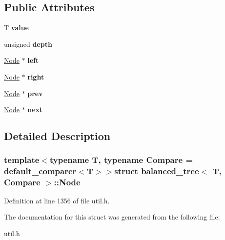 \subsection*{Public Attributes}
\begin{DoxyCompactItemize}
\item 
\hypertarget{structbalanced__tree_1_1Node_a69d2192f5a2a3c1ce82fd7b8a99e6654}{T {\bfseries value}}\label{structbalanced__tree_1_1Node_a69d2192f5a2a3c1ce82fd7b8a99e6654}

\item 
\hypertarget{structbalanced__tree_1_1Node_a7e92fc4d0addec0e7956eaa6088ae014}{unsigned {\bfseries depth}}\label{structbalanced__tree_1_1Node_a7e92fc4d0addec0e7956eaa6088ae014}

\item 
\hypertarget{structbalanced__tree_1_1Node_ab3452de39a8f961ca4b76d336e8ef0c0}{\hyperlink{structbalanced__tree_1_1Node}{Node} $\ast$ {\bfseries left}}\label{structbalanced__tree_1_1Node_ab3452de39a8f961ca4b76d336e8ef0c0}

\item 
\hypertarget{structbalanced__tree_1_1Node_a68732d6d4528935c840672abe489b930}{\hyperlink{structbalanced__tree_1_1Node}{Node} $\ast$ {\bfseries right}}\label{structbalanced__tree_1_1Node_a68732d6d4528935c840672abe489b930}

\item 
\hypertarget{structbalanced__tree_1_1Node_a0e9185b9161946f62da07df8ca0c3041}{\hyperlink{structbalanced__tree_1_1Node}{Node} $\ast$ {\bfseries prev}}\label{structbalanced__tree_1_1Node_a0e9185b9161946f62da07df8ca0c3041}

\item 
\hypertarget{structbalanced__tree_1_1Node_a0598ff564ee027d80d9bae2ea40d556d}{\hyperlink{structbalanced__tree_1_1Node}{Node} $\ast$ {\bfseries next}}\label{structbalanced__tree_1_1Node_a0598ff564ee027d80d9bae2ea40d556d}

\end{DoxyCompactItemize}


\subsection{Detailed Description}
\subsubsection*{template$<$typename T, typename Compare = default\+\_\+comparer$<$\+T$>$$>$struct balanced\+\_\+tree$<$ T, Compare $>$\+::\+Node}



Definition at line 1356 of file util.\+h.



The documentation for this struct was generated from the following file\+:\begin{DoxyCompactItemize}
\item 
util.\+h\end{DoxyCompactItemize}
